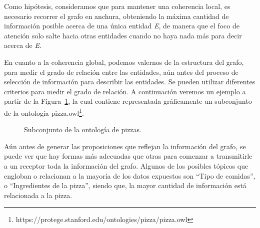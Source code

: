 Como hipótesis, consideramos que para mantener una coherencia local, es necesario recorrer el grafo en anchura, obteniendo la máxima cantidad de información posible acerca de una única entidad \emph{E}, de manera que el foco de atención solo salte hacia otras entidades cuando no haya nada más para decir acerca de \emph{E}.

En cuanto a la coherencia global, podemos valernos de la estructura del grafo, para medir el grado de relación entre las entidades, aún antes del proceso de selección de información para describir las entidades. Se pueden utilizar diferentes criterios para medir el grado de relación. A continuación veremos un ejemplo a partir de la Figura~\ref{fig:pizza.owl}, la cual contiene representada gráficamente un subconjunto de la ontología pizza.owl\footnote{https://protege.stanford.edu/ontologies/pizza/pizza.owl}.

\begin{figure}
\centering
{}
\caption{Subconjunto de la ontología de pizzas.} \label{fig:pizza.owl}
\end{figure}

Aún antes de generar las proposiciones que reflejan la información del grafo, se puede ver que hay formas más adecuadas que otras para comenzar a transmitirle a un receptor toda la información del grafo. Algunos de los posibles tópicos que engloban o relacionan a la mayoría de los datos expuestos son ``Tipo de comidas'', o ``Ingredientes de la pizza'', siendo que, la mayor cantidad de información está relacionada a la pizza. 

